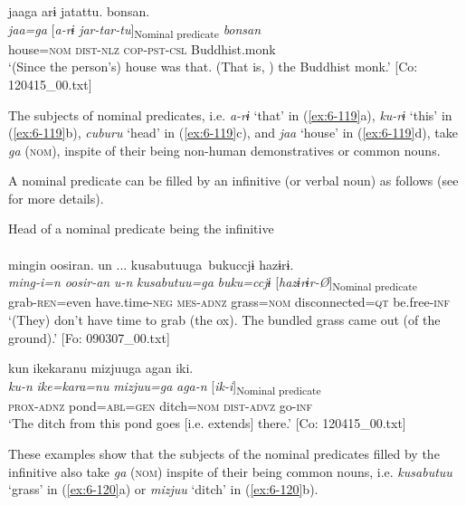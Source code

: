 \ex
{\TM}
\gll jaaga  arɨ  jatattu.  bonsan.\\
      \textit{jaa=ga}  [\textit{a-rɨ}  \textit{jar-tar-tu}]\textsubscript{Nominal predicate}  \textit{bonsan}\\
      house=\textsc{nom}  \textsc{dist}-\textsc{nlz}  \textsc{cop}-\textsc{pst}-\textsc{csl}  Buddhist.monk\\
\glt ‘(Since the person’s) house was that. (That is, ) the Buddhist monk.’ [Co: 120415\_00.txt]
\z
\z

The subjects of nominal predicates, i.e. \textit{a-rɨ} ‘that’ in (\ref{ex:6-119}a), \textit{ku-rɨ} ‘this’ in (\ref{ex:6-119}b), \textit{cuburu} ‘head’ in (\ref{ex:6-119}c), and \textit{jaa} ‘house’ in (\ref{ex:6-119}d), take \textit{ga} (\textsc{nom}), inspite of their being non-human demonstratives or common nouns.

A nominal predicate can be filled by an infinitive (or verbal noun) as follows (see  for more details).

\ea\label{ex:6-120}
 Head of a nominal predicate being the infinitive\\

 \ea{}\\
{\TM}
\glll  mingin  oosiran.  un ...  kusabutuuga\    bukuccjɨ  hazɨrɨ.\\
\textit{ming-i=n}  \textit{oosir-an}  \textit{u-n}  \textit{kusabutuu=ga}    \textit{buku=ccjɨ}  [\textit{hazɨrɨr-Ø}]\textsubscript{Nominal predicate}\\
grab-\textsc{ren}=even  have.time-\textsc{neg}  \textsc{mes}-\textsc{adnz}  grass=\textsc{nom}      disconnected=\textsc{qt}  be.free-\textsc{inf}\\
\glt ‘(They) don’t have time to grab (the ox). The bundled grass came out (of the ground).’ [Fo: 090307\_00.txt]

\ex
{\TM}
\glll kun  {\textbar}ike{\textbar}karanu  mizjuuga  agan  iki.\\
\textit{ku-n}  \textit{ike=kara=nu}  \textit{mizjuu=ga}  \textit{aga-n}  [\textit{ik-i}]\textsubscript{Nominal predicate}\\
\textsc{prox}-\textsc{adnz}  pond=\textsc{abl}=\textsc{gen}  ditch=\textsc{nom}  \textsc{dist}-\textsc{advz}  go-\textsc{inf}\\
\glt ‘The ditch from this pond goes [i.e. extends] there.’ [Co: 120415\_00.txt]
\z
\z

These examples show that the subjects of the nominal predicates filled by the infinitive also take \textit{ga} (\textsc{nom}) inspite of their being common nouns, i.e. \textit{kusabutuu} ‘grass’ in (\ref{ex:6-120}a) or \textit{mizjuu} ‘ditch’ in (\ref{ex:6-120}b).

